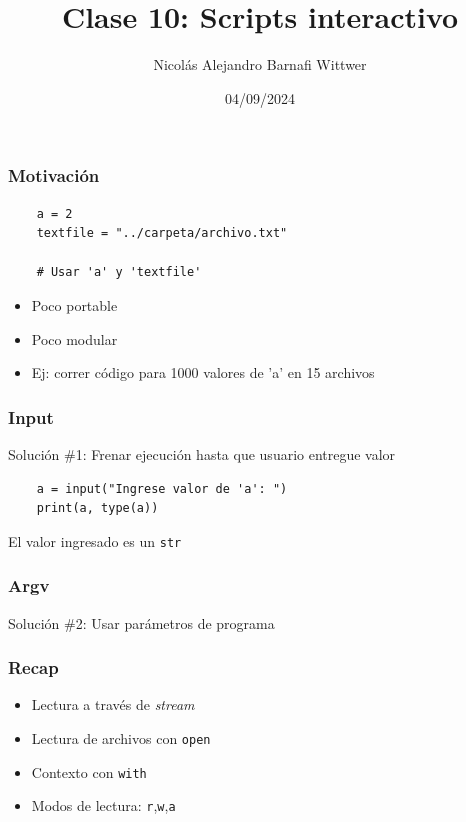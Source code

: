 \documentclass[14pt,aspectratio=169,xcolor=dvipsnames]{beamer}
\title[short title]{Clase 10: Scripts interactivo}
\subtitle{}
\author[NA Barnafi] {Nicolás Alejandro Barnafi Wittwer}
\institute[UC|CMM] 
{
    Pontificia Universidad Católica de Chile \\
    Centro de Modelamiento Matemático
}
\date{04/09/2024}
\newcommand{\code}[1]{{\color{purple}\tt#1}}
\begin{document}
\begin{frame}
    \maketitle
\end{frame}
\begin{frame}[fragile]\frametitle{Motivación}
    \begin{verbatim}
    a = 2
    textfile = "../carpeta/archivo.txt"
    
    # Usar 'a' y 'textfile'
    \end{verbatim}
    \begin{itemize}
        \item Poco portable
        \item Poco modular
        \item Ej: correr código para 1000 valores de 'a' en 15 archivos
    \end{itemize}

\pause {}
\end{frame}
\begin{frame}\frametitle{Input}
    Solución \#1: Frenar ejecución hasta que usuario entregue valor
    
    \begin{verbatim}
    a = input("Ingrese valor de 'a': ")
    print(a, type(a))
    \end{verbatim}

    El valor ingresado es un \code{str}
\end{frame}
\begin{frame}\frametitle{Argv}
    Solución \#2: Usar parámetros de programa
\end{frame}
\begin{frame}


\end{frame}
\begin{frame}\frametitle{Recap}
    \begin{itemize}
        \item Lectura a través de \emph{stream}
        \item Lectura de archivos con \code{open}
        \item Contexto con \code{with}
        \item Modos de lectura: \code{r},\code{w},\code{a}
    \end{itemize}
\end{frame}
\begin{frame}
    \maketitle
\end{frame}
\end{document}
